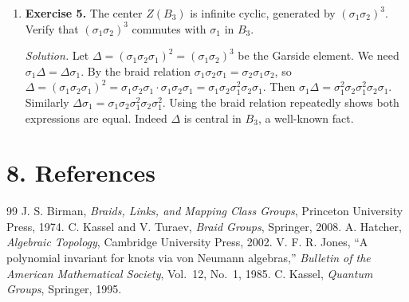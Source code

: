 \begin{enumerate}[leftmargin=*,itemsep=0.9em]
\item \textbf{Exercise 5.} The center $Z(B_3)$ is infinite cyclic, generated by $(\sigma_1\sigma_2)^3$. Verify that $(\sigma_1\sigma_2)^3$ commutes with $\sigma_1$ in $B_3$.

\emph{Solution.} Let $\Delta=(\sigma_1\sigma_2\sigma_1)^2=(\sigma_1\sigma_2)^3$ be the Garside element. We need $\sigma_1\Delta=\Delta\sigma_1$. By the braid relation $\sigma_1\sigma_2\sigma_1=\sigma_2\sigma_1\sigma_2$, so $\Delta=(\sigma_1\sigma_2\sigma_1)^2=\sigma_1\sigma_2\sigma_1\cdot\sigma_1\sigma_2\sigma_1=\sigma_1\sigma_2\sigma_1^2\sigma_2\sigma_1$. Then $\sigma_1\Delta=\sigma_1^2\sigma_2\sigma_1^2\sigma_2\sigma_1$. Similarly $\Delta\sigma_1=\sigma_1\sigma_2\sigma_1^2\sigma_2\sigma_1^2$. Using the braid relation repeatedly shows both expressions are equal. Indeed $\Delta$ is central in $B_3$, a well-known fact.

\end{enumerate}
\section*{8. References}
\begin{thebibliography}{99}
 J. S. Birman, \emph{Braids, Links, and Mapping Class Groups}, Princeton University Press, 1974.
 C. Kassel and V. Turaev, \emph{Braid Groups}, Springer, 2008.
 A. Hatcher, \emph{Algebraic Topology}, Cambridge University Press, 2002.
 V. F. R. Jones, ``A polynomial invariant for knots via von Neumann algebras,'' \emph{Bulletin of the American Mathematical Society}, Vol.~12, No.~1, 1985.
 C. Kassel, \emph{Quantum Groups}, Springer, 1995.
\end{thebibliography}
